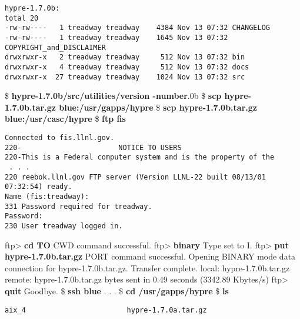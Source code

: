 \begin{ttfamily}
\begin{mdseries}
\begin{verbatim}
hypre-1.7.0b:
total 20
-rw-rw----   1 treadway treadway    4384 Nov 13 07:32 CHANGELOG
-rw-rw----   1 treadway treadway    1645 Nov 13 07:32 COPYRIGHT_and_DISCLAIMER
drwxrwxr-x   2 treadway treadway     512 Nov 13 07:32 bin
drwxrwxr-x   4 treadway treadway     512 Nov 13 07:32 docs
drwxrwxr-x  27 treadway treadway    1024 Nov 13 07:32 src
\end{verbatim}
\$ \textbf{hypre-1.7.0b/src/utilities/version -number}.0b\linebreak
\$ \textbf{scp hypre-1.7.0b.tar.gz blue:/usr/gapps/hypre}\linebreak
\$ \textbf{scp hypre-1.7.0b.tar.gz blue:/usr/casc/hypre}\linebreak
\$ \textbf{ftp fis}\linebreak
\begin{verbatim}
Connected to fis.llnl.gov.
220-                       NOTICE TO USERS
220-This is a Federal computer system and is the property of the
 . . .
220 reebok.llnl.gov FTP server (Version LLNL-22 built 08/13/01 07:32:54) ready.
Name (fis:treadway):
331 Password required for treadway.
Password:
230 User treadway logged in.
\end{verbatim}
ftp> \textbf{cd TO} CWD command successful.\linebreak
ftp> \textbf{binary} Type set to I.\linebreak
ftp> \textbf{put hypre-1.7.0b.tar.gz} PORT command successful. Opening BINARY mode data connection for hypre-1.7.0b.tar.gz. Transfer complete.\linebreak
local: hypre-1.7.0b.tar.gz remote: hypre-1.7.0b.tar.gz bytes sent in 0.49 seconds (3342.89 Kbytes/s)\linebreak
ftp> \textbf{quit} Goodbye.\linebreak
\$ \textbf{ssh blue}\linebreak
 . . .\linebreak
\$ \textbf{cd /usr/gapps/hypre}\linebreak
\$ \textbf{ls}\linebreak
\begin{verbatim}
aix_4                        hypre-1.7.0a.tar.gz

\end{verbatim}
\end{mdseries}
\end{ttfamily}
